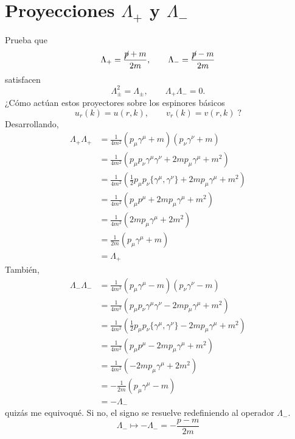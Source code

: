 \section{Proyecciones $\Lambda_+$ y $\Lambda_-$}
\begingroup\color{blue}
Prueba que
\begin{equation}
\Lambda_+=\frac{\cancel p+m}{2m},\qquad
\Lambda_-=\frac{\cancel p-m}{2m}
\end{equation}
satisfacen
\begin{equation}
\Lambda_\pm^2=\Lambda_\pm,\qquad
\Lambda_+\Lambda_-=0.
\end{equation}
¿Cómo actúan estos proyectores sobre los espinores básicos
\begin{equation}
u_r(k)=u(r,k),\qquad
v_r(k)=v(r,k)\;\text{?}
\end{equation}
\endgroup
Desarrollando,
\begin{equation}\begin{split}
\Lambda_+\Lambda_+
&=\frac1{4m^2}(p_\mu\gamma^\mu+m)(p_\nu\gamma^\nu+m)\\
&=\frac1{4m^2}(p_\mu p_\nu\gamma^\mu\gamma^\nu+2mp_\mu\gamma^\mu+m^2)\\
&=\frac1{4m^2}(\tfrac12p_\mu p_\nu\{\gamma^\mu,\gamma^\nu\}+2mp_\mu\gamma^\mu+m^2)\\
&=\frac1{4m^2}(p_\mu p^\mu+2mp_\mu\gamma^\mu+m^2)\\
&=\frac1{4m^2}(2mp_\mu\gamma^\mu+2m^2)\\
&=\frac1{2m}(p_\mu\gamma^\mu+m)\\
&=\Lambda_+
\end{split}\end{equation}
También,
\begin{equation}\begin{split}
\Lambda_-\Lambda_-
&=\frac1{4m^2}(p_\mu\gamma^\mu-m)(p_\nu\gamma^\nu-m)\\
&=\frac1{4m^2}(p_\mu p_\nu\gamma^\mu\gamma^\nu-2mp_\mu\gamma^\mu+m^2)\\
&=\frac1{4m^2}(\tfrac12p_\mu p_\nu\{\gamma^\mu,\gamma^\nu\}-2mp_\mu\gamma^\mu+m^2)\\
&=\frac1{4m^2}(p_\mu p^\mu-2mp_\mu\gamma^\mu+m^2)\\
&=\frac1{4m^2}(-2mp_\mu\gamma^\mu+2m^2)\\
&=-\frac1{2m}(p_\mu\gamma^\mu-m)\\
&=-\Lambda_-
\end{split}\end{equation}
quizás me equivoqué. Si no, el signo se resuelve redefiniendo al operador $\Lambda_-$.
$$\Lambda_-\mapsto-\Lambda_-=-\frac{p-m}{2m}$$
